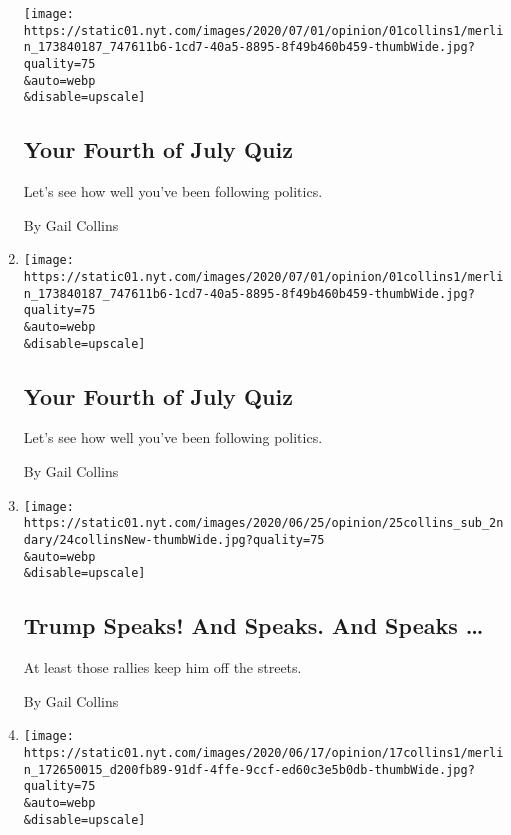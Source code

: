 \begin{enumerate}
  \texttt{[image: https://static01.nyt.com/images/2020/07/01/opinion/01collins1/merlin\_173840187\_747611b6-1cd7-40a5-8895-8f49b460b459-thumbWide.jpg?quality=75\\\&auto=webp\\\&disable=upscale]}

  \hypertarget{your-fourth-of-july-quiz}{%
  \subsection{Your Fourth of July Quiz}\label{your-fourth-of-july-quiz}}

  Let's see how well you've been following politics.

  By Gail Collins
\item
  \href{/interactive/2020/07/01/opinion/4th-of-july-quiz.html}{}

  \texttt{[image: https://static01.nyt.com/images/2020/07/01/opinion/01collins1/merlin\_173840187\_747611b6-1cd7-40a5-8895-8f49b460b459-thumbWide.jpg?quality=75\\\&auto=webp\\\&disable=upscale]}

  \hypertarget{your-fourth-of-july-quiz-1}{%
  \subsection{Your Fourth of July
  Quiz}\label{your-fourth-of-july-quiz-1}}

  Let's see how well you've been following politics.

  By Gail Collins
\item
  \href{/2020/06/24/opinion/trump-tulsa-2020.html}{}

  \texttt{[image: https://static01.nyt.com/images/2020/06/25/opinion/25collins\_sub\_2ndary/24collinsNew-thumbWide.jpg?quality=75\\\&auto=webp\\\&disable=upscale]}

  \hypertarget{trump-speaks-and-speaks-and-speaks-}{%
  \subsection{Trump Speaks! And Speaks. And Speaks
  \ldots{}}\label{trump-speaks-and-speaks-and-speaks-}}

  At least those rallies keep him off the streets.

  By Gail Collins
\item
  \href{/2020/06/17/opinion/mitch-mcconnell-kentucky-senate.html}{}

  \texttt{[image: https://static01.nyt.com/images/2020/06/17/opinion/17collins1/merlin\_172650015\_d200fb89-91df-4ffe-9ccf-ed60c3e5b0db-thumbWide.jpg?quality=75\\\&auto=webp\\\&disable=upscale]}


\end{enumerate}
